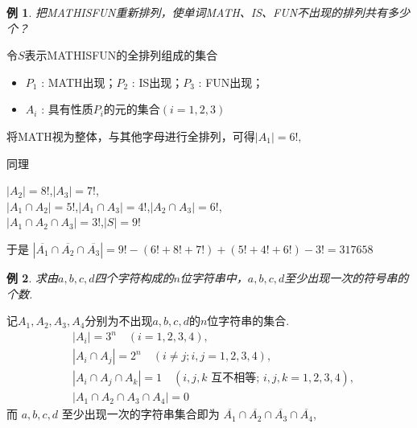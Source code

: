 \documentclass[punct]{ctexbeamer}
\newtheorem{ex}{例}
\def\sol{\noindent {\bf 解\ }}
\begin{document}
\begin{frame}
    \begin{ex}
        把MATHISFUN重新排列，使单词MATH、IS、FUN不出现的排列共有多少个？
    \end{ex}
    \pause
    \sol 令$S$表示MATHISFUN的全排列组成的集合
    \begin{itemize}
        \item $P_{1}$ : MATH出现；\quad $P_{2}$ : IS出现；\quad $P_{3}$ : FUN出现；
        \item $A_{i}$ : 具有性质$P_{i}$的元的集合$(i=1,2,3)$
    \end{itemize}

    将MATH视为整体，与其他字母进行全排列，可得$|A_{1}|=6!,$
    \pause

    同理\vspace{-10pt}
    \begin{center}
        $|A_{2}|=8!$,\qquad $|A_{3}|=7!$, \\[6pt]
        $|A_{1}\cap A_{2}|=5!$,\quad  $|A_{1}\cap A_{3}|=4!$,\quad  $|A_{2}\cap A_{3}|=6!$, \\[6pt]
        $|A_{1}\cap A_{2}\cap A_{3}|=3!$,\quad  $|S|=9!$
    \end{center}
    于是
    $
    |\overline{A_{1}}\cap\overline{A_{2}}\cap\overline{A_{3}}|
    = 9!-(6!+8!+7!)+(5!+4!+6!)-3!
    = 317658
    $
\end{frame}


\begin{frame}
\begin{ex}
		求由$a,b,c,d$四个字符构成的$n$位字符串中，$a,b,c,d$至少出现一次的符号串的个数.
\end{ex}
\pause
\sol
记$A_1,A_2,A_3,A_4$分别为不出现$a,b,c,d$的$n$位字符串的集合.
\begin{align*}
    &\left|A_{i}\right|=3^{n} \quad(i=1,2,3,4), \\
    &\left|A_{i} \cap A_{j}\right|=2^{n} \quad(i \neq j ; i, j=1,2,3,4), \\
    &\left|A_{i} \cap A_{j} \cap A_{k}\right|=1 \quad(i, j, k \text { 互不相等; } i, j, k=1,2,3,4), \\
    &\left| A_{1} \cap A_{2} \cap A_{3} \cap A_{4} \right|=0
\end{align*}
而 $a, b, c, d$ 至少出现一次的字符串集合即为 $\overline{A_{1}} \cap \overline{A_{2}} \cap \overline{A_{3}} \cap \overline{A_{4}}$,
\end{frame}
\end{document}
